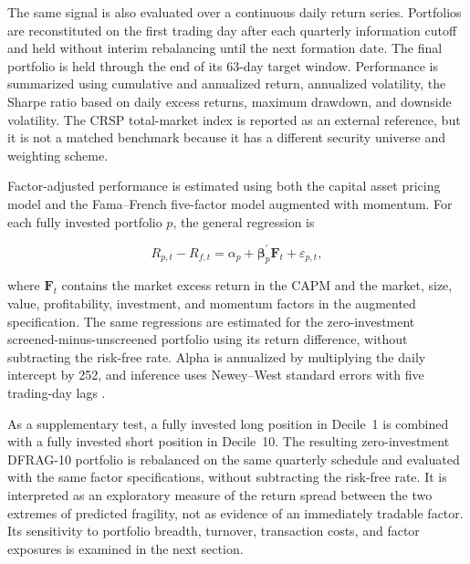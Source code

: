 The same signal is also evaluated over a continuous daily return series. Portfolios are reconstituted on the first trading day after each quarterly information cutoff and held without interim rebalancing until the next formation date. The final portfolio is held through the end of its 63-day target window. Performance is summarized using cumulative and annualized return, annualized volatility, the Sharpe ratio based on daily excess returns, maximum drawdown, and downside volatility. The CRSP total-market index is reported as an external reference, but it is not a matched benchmark because it has a different security universe and weighting scheme.

Factor-adjusted performance is estimated using both the capital asset pricing model \parencite{sharpe1964capital} and the Fama--French five-factor model augmented with momentum. For each fully invested portfolio \(p\), the general regression is

\begin{equation}
    R_{p,t}-R_{f,t}
    =
    \alpha_p
    +
    \boldsymbol{\beta}_p^{\prime}\mathbf{F}_t
    +
    \varepsilon_{p,t},
    \label{eq:factor_regression}
\end{equation}

\noindent
where \(\mathbf{F}_t\) contains the market excess return in the CAPM and the market, size, value, profitability, investment, and momentum factors in the augmented specification. The same regressions are estimated for the zero-investment screened-minus-unscreened portfolio using its return difference, without subtracting the risk-free rate. Alpha is annualized by multiplying the daily intercept by 252, and inference uses Newey--West standard errors with five trading-day lags \parencite{newey1987simple}.

As a supplementary test, a fully invested long position in Decile~1 is combined with a fully invested short position in Decile~10. The resulting zero-investment DFRAG-10 portfolio is rebalanced on the same quarterly schedule and evaluated with the same factor specifications, without subtracting the risk-free rate. It is interpreted as an exploratory measure of the return spread between the two extremes of predicted fragility, not as evidence of an immediately tradable factor. Its sensitivity to portfolio breadth, turnover, transaction costs, and factor exposures is examined in the next section.
